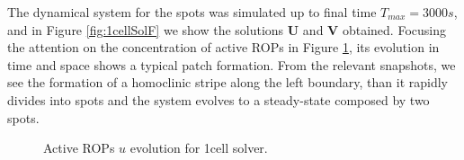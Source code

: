 The dynamical system for the spots was simulated up to final time $T_{max} = 3000s$, and in Figure \ref{fig:1cellSolF} we show the solutions $\mathbf{U}$ and $\mathbf{V}$ obtained. Focusing the attention on the concentration of active ROPs in Figure \ref{fig:1cellUevolution}, its evolution in time and space shows a typical patch formation. From the relevant snapshots, we see the formation of a homoclinic stripe along the left boundary, than it rapidly divides into spots and the system evolves to a steady-state composed by two spots.
\begin{figure}[H]
    \centering
    \quad
    \quad
    \quad
    \quad
    \quad
    \caption[1cell Active ROPs]{Active ROPs $u$ evolution for 1cell solver.}
    \label{fig:1cellUevolution}
\end{figure}
